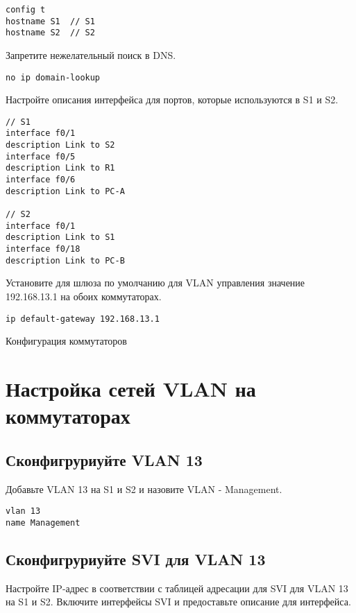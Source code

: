 \begin{verbatim}
config t
hostname S1  // S1
hostname S2  // S2
\end{verbatim}

Запретите нежелательный поиск в DNS.

\begin{verbatim}
no ip domain-lookup
\end{verbatim}

Настройте описания интерфейса для портов, которые используются в S1 и S2.

\begin{verbatim}
// S1
interface f0/1
description Link to S2
interface f0/5
description Link to R1
interface f0/6
description Link to PC-A

// S2
interface f0/1
description Link to S1
interface f0/18
description Link to PC-B
\end{verbatim}

Установите для шлюза по умолчанию для VLAN управления значение 192.168.13.1
на обоих коммутаторах.

\begin{verbatim}
ip default-gateway 192.168.13.1
\end{verbatim}

\begin{image}
	\caption{Конфигурация коммутаторов}
\end{image}

\section{Настройка сетей VLAN на коммутаторах}

\subsection{Сконфигруриуйте VLAN 13}

Добавьте VLAN 13 на S1 и S2 и назовите VLAN - Management.

\begin{verbatim}
vlan 13
name Management
\end{verbatim}

\subsection{Сконфигруриуйте SVI для VLAN 13}

Настройте IP-адрес в соответствии с таблицей адресации для SVI для VLAN 13
на S1 и S2. Включите интерфейсы SVI и предоставьте описание для интерфейса.

